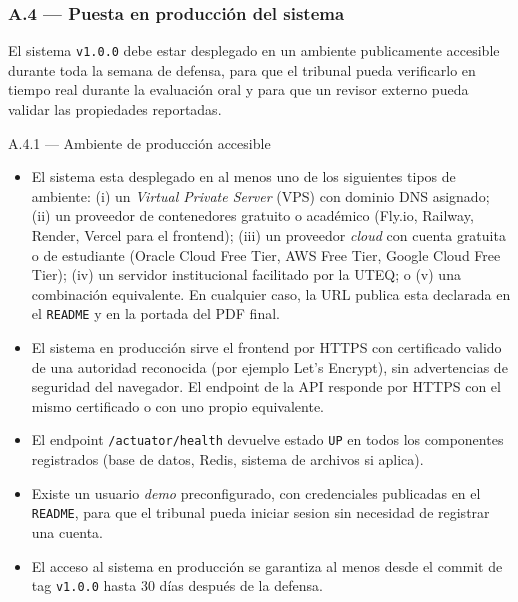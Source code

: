\documentclass[11pt,a4paper]{article}
\begin{document}
\subsubsection*{A.4 --- Puesta en producci\'{o}n del sistema}

El sistema \texttt{v1.0.0} debe estar desplegado en un ambiente publicamente accesible durante toda la semana de defensa, para que el tribunal pueda verificarlo en tiempo real durante la evaluaci\'{o}n oral y para que un revisor externo pueda validar las propiedades reportadas.

\begin{cajaentregable}{A.4.1 --- Ambiente de producci\'{o}n accesible}
    \begin{itemize}
        \item El sistema esta desplegado en al menos uno de los siguientes tipos de ambiente: (i) un \emph{Virtual Private Server} (VPS) con dominio DNS asignado; (ii) un proveedor de contenedores gratuito o acad\'{e}mico (Fly.io, Railway, Render, Vercel para el frontend); (iii) un proveedor \emph{cloud} con cuenta gratuita o de estudiante (Oracle Cloud Free Tier, AWS Free Tier, Google Cloud Free Tier); (iv) un servidor institucional facilitado por la UTEQ; o (v) una combinaci\'{o}n equivalente. En cualquier caso, la URL publica esta declarada en el \texttt{README} y en la portada del PDF final.
        \item El sistema en producci\'{o}n sirve el frontend por HTTPS con certificado valido de una autoridad reconocida (por ejemplo Let's Encrypt), sin advertencias de seguridad del navegador. El endpoint de la API responde por HTTPS con el mismo certificado o con uno propio equivalente.
        \item El endpoint \texttt{/actuator/health} devuelve estado \texttt{UP} en todos los componentes registrados (base de datos, Redis, sistema de archivos si aplica).
        \item Existe un usuario \emph{demo} preconfigurado, con credenciales publicadas en el \texttt{README}, para que el tribunal pueda iniciar sesion sin necesidad de registrar una cuenta.
        \item El acceso al sistema en producci\'{o}n se garantiza al menos desde el commit de tag \texttt{v1.0.0} hasta 30 d\'{i}as despu\'{e}s de la defensa.
    \end{itemize}
\end{cajaentregable}
\end{document}
